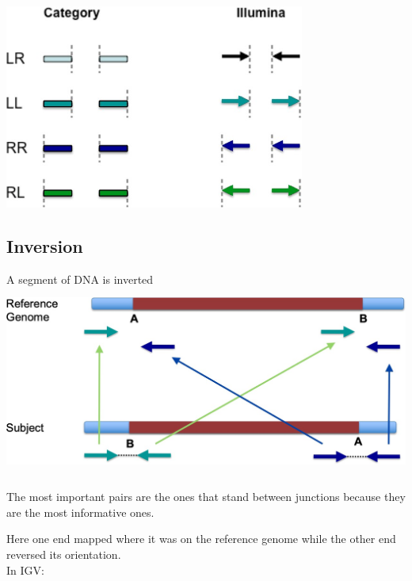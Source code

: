 \includegraphics[width=3.89062in,height=2.65in]{image20.jpeg}


\hypertarget{inversion}{%
\subsection{Inversion}\label{inversion}}


A segment of DNA is inverted\\


\includegraphics[width=5.85745in,height=2.45625in]{image21.jpeg}


The most important pairs are the ones that stand between junctions because they
are the most informative ones.

Here one end mapped where it was on the reference genome while the other end
reversed its orientation.\\

In IGV:\\


